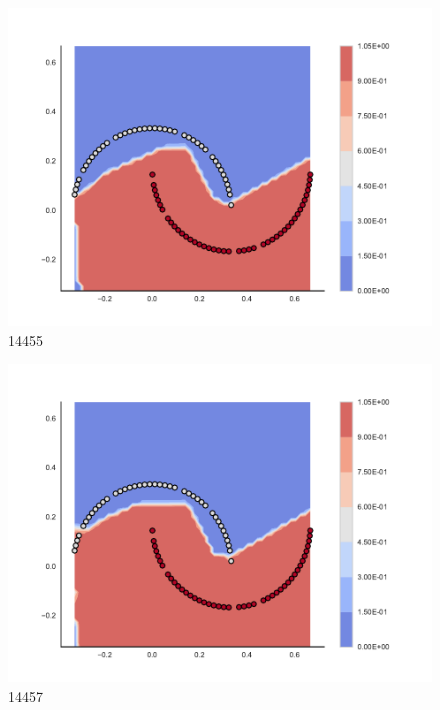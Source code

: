 \begin{subfigure}[b]{0.09\textwidth}
    \includegraphics[clip, trim=2.35cm 1.75cm 4.5cm 0cm,width=\textwidth]{img/convergence/14455.pdf}
    \caption{14455}
    \label{fig:convergence_14455}
\end{subfigure}
%
\begin{subfigure}[b]{0.09\textwidth}
    \includegraphics[clip, trim=2.35cm 1.75cm 4.5cm 0cm,width=\textwidth]{img/convergence/14457.pdf}
    \caption{14457}
    \label{fig:convergence_14457}
\end{subfigure}
%

